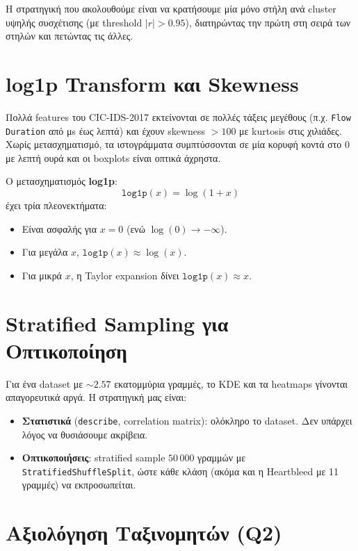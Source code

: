 \documentclass[12pt,a4paper,twoside]{book}
\begin{document}
Η στρατηγική που ακολουθούμε είναι να κρατήσουμε μία μόνο στήλη ανά
cluster υψηλής συσχέτισης (με threshold \(|r|>0.95\)), διατηρώντας την
πρώτη στη σειρά των στηλών και πετώντας τις άλλες.

\section{log1p Transform και Skewness}

Πολλά features του CIC-IDS-2017 εκτείνονται σε πολλές τάξεις μεγέθους
(π.χ. \texttt{Flow Duration} από μs έως λεπτά) και έχουν skewness
\(>100\) με kurtosis στις χιλιάδες. Χωρίς μετασχηματισμό, τα ιστογράμματα
συμπτύσσονται σε μία κορυφή κοντά στο 0 με λεπτή ουρά και οι boxplots
είναι οπτικά άχρηστα.

Ο μετασχηματισμός \textbf{log1p}:
\begin{equation}
    \texttt{log1p}(x) = \log(1+x)
\end{equation}
έχει τρία πλεονεκτήματα:
\begin{itemize}
    \item Είναι ασφαλής για \(x=0\) (ενώ \(\log(0) \to -\infty\)).
    \item Για μεγάλα \(x\), \(\texttt{log1p}(x) \approx \log(x)\).
    \item Για μικρά \(x\), η Taylor expansion δίνει \(\texttt{log1p}(x) \approx x\).
\end{itemize}

\section{Stratified Sampling για Οπτικοποίηση}

Για ένα dataset με \(\sim 2.57\) εκατομμύρια γραμμές, το KDE και τα
heatmaps γίνονται απαγορευτικά αργά. Η στρατηγική μας είναι:
\begin{itemize}
    \item \textbf{Στατιστικά} (\texttt{describe}, correlation matrix):
    ολόκληρο το dataset. Δεν υπάρχει λόγος να θυσιάσουμε ακρίβεια.
    \item \textbf{Οπτικοποιήσεις}: stratified sample \(50\,000\) γραμμών με
    \texttt{StratifiedShuffleSplit}, ώστε κάθε κλάση (ακόμα και η
    Heartbleed με 11 γραμμές) να εκπροσωπείται.
\end{itemize}

\section{Αξιολόγηση Ταξινομητών (Q2)}
\end{document}
